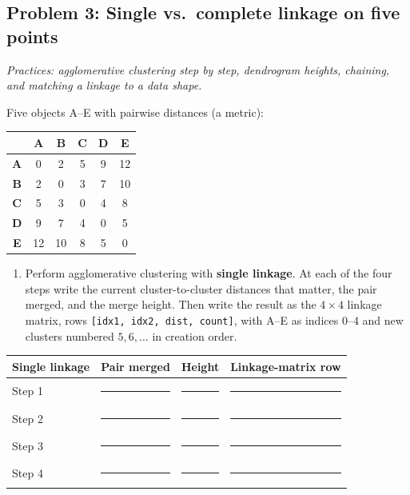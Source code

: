 \documentclass[
  11pt,
]{article}
\providecommand{\tightlist}{%
  \setlength{\itemsep}{0pt}\setlength{\parskip}{0pt}}
\newcommand{\blank}[1][1.2in]{\rule{#1}{0.4pt}}
\newcommand{\answerpage}{\clearpage}
\begin{document}
\answerpage

\subsection{Problem 3: Single vs.~complete linkage on five
points}\label{problem-3-single-vs.-complete-linkage-on-five-points}

\emph{Practices: agglomerative clustering step by step, dendrogram
heights, chaining, and matching a linkage to a data shape.}

Five objects A--E with pairwise distances (a metric):

\begin{longtable}[]{@{}cccccc@{}}
\toprule\noalign{}
& A & B & C & D & E \\
\midrule\noalign{}
\endhead
\bottomrule\noalign{}
\endlastfoot
\textbf{A} & 0 & 2 & 5 & 9 & 12 \\
\textbf{B} & 2 & 0 & 3 & 7 & 10 \\
\textbf{C} & 5 & 3 & 0 & 4 & 8 \\
\textbf{D} & 9 & 7 & 4 & 0 & 5 \\
\textbf{E} & 12 & 10 & 8 & 5 & 0 \\
\end{longtable}

\begin{enumerate}
\def\labelenumi{(\alph{enumi})}
\tightlist
\item
  Perform agglomerative clustering with \textbf{single linkage}. At each
  of the four steps write the current cluster-to-cluster distances that
  matter, the pair merged, and the merge height. Then write the result
  as the \(4\times4\) linkage matrix, rows
  \texttt{{[}idx1,\ idx2,\ dist,\ count{]}}, with A--E as indices
  \(0\)--\(4\) and new clusters numbered \(5, 6, \dots\) in creation
  order.
\end{enumerate}

\begin{longtable}[]{@{}llll@{}}
\toprule\noalign{}
Single linkage & Pair merged & Height & Linkage-matrix row \\
\midrule\noalign{}
\endhead
\bottomrule\noalign{}
\endlastfoot
Step 1 & \blank[1.2in] & \blank[0.7in] & \blank[2in] \\
Step 2 & \blank[1.2in] & \blank[0.7in] & \blank[2in] \\
Step 3 & \blank[1.2in] & \blank[0.7in] & \blank[2in] \\
Step 4 & \blank[1.2in] & \blank[0.7in] & \blank[2in] \\
\end{longtable}
\end{document}
